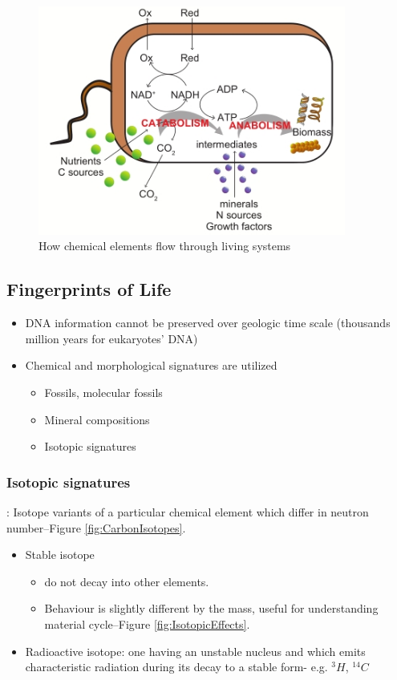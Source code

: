 \documentclass[]{article}
\begin{document}
\begin{figure}[H]
	\caption[How chemical elements flow through living systems]{How chemical elements flow through living systems\cite{linares-pasten_2018}}\label{fig:Biogeochemistry}
	\includegraphics[width=0.9\textwidth]{Biogeochemistry}
\end{figure}

\subsection{Fingerprints of Life}
\begin{itemize}
	\item  DNA information cannot be preserved over geologic time
	scale (thousands ~ million years for eukaryotes' DNA)
	\item Chemical and morphological signatures are utilized
	\begin{itemize}
		\item  Fossils, molecular fossils
		\item Mineral compositions
		\item Isotopic signatures
	\end{itemize}
\end{itemize}

\subsubsection{Isotopic signatures}: Isotope variants of a particular chemical element
which differ in neutron number--Figure \ref{fig:CarbonIsotopes}.
\begin{itemize}
	\item  Stable isotope
	\begin{itemize}
		\item do not decay into other elements.
		\item Behaviour is slightly different by the mass, useful for understanding 	material cycle--Figure \ref{fig:IsotopicEffects}.
	\end{itemize}
	\item Radioactive isotope: one having an unstable nucleus and which emits characteristic radiation during its decay to a stable form- e.g. $^3H$, $^14C$
\end{itemize}
\end{document}
